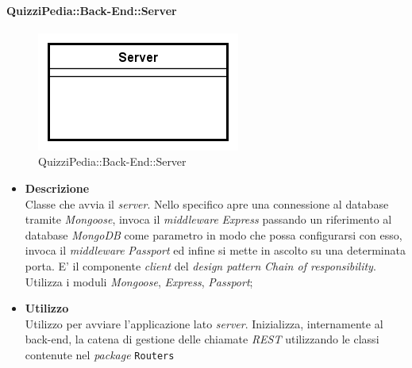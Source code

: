 	\paragraph{QuizziPedia::Back-End::Server}
\label{QuizziPedia::Back-End::Server}
\begin{figure}[ht]
	\centering
	\includegraphics[scale=0.45]{UML/Classi/Back-End/QuizziPedia_Back-End_Server.png}
	\caption{QuizziPedia::Back-End::Server}
\end{figure}
\FloatBarrier
	\begin{itemize}
		\item \textbf{Descrizione} \\
		Classe che avvia il \textit{server}. Nello specifico apre una connessione al database tramite \textit{Mongoose}, invoca il \textit{middleware} \textit{Express} passando un riferimento al database \textit{MongoDB} come parametro in modo  che possa configurarsi con esso, invoca il \textit{middleware} \textit{Passport} ed infine si mette in ascolto su una determinata porta. E' il componente \textit{client} del \textit{design pattern} \textit{Chain of responsibility}. Utilizza i moduli \textit{Mongoose}, \textit{Express}, \textit{Passport};
		\item \textbf{Utilizzo} \\
		Utilizzo per avviare l'applicazione lato \textit{server}. Inizializza, internamente al back-end, la catena di gestione delle chiamate \textit{REST} utilizzando le classi contenute nel \textit{package} \texttt{Routers}
	\end{itemize}
	